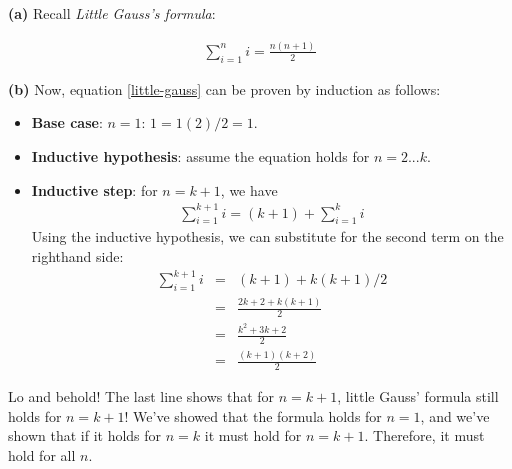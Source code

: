 \documentclass[11pt]{article}
\renewcommand{\part}[1] {\vspace{.10in} {\bf (#1)}}
\begin{document}
\part{a} Recall {\em Little Gauss's formula}:

\begin{eqnarray}
\sum_{i=1}^n i = {\frac{n(n+1)}2}  %
\label{little-gauss}        %
\end{eqnarray}

\part{b} Now, equation \ref{little-gauss} can be proven by induction as
follows:

\begin{itemize}
\item {\bf Base case}: $n=1$: $1 = 1(2)/2=1$.
\item {\bf Inductive hypothesis}: assume the equation holds for $n=2...k$.
\item {\bf Inductive step}: for $n=k+1$, we have
\begin{eqnarray*}    %
\sum_{i=1}^{k+1} i = (k+1) + \sum_{i=1}^k i
\end{eqnarray*}
Using the inductive hypothesis, we can substitute for the second term
on the righthand side:
\begin{eqnarray*}
\sum_{i=1}^{k+1} i &=& (k+1) + k(k+1)/2\\    
                   &=& {\frac{{2k+2 + k(k+1)}}2}\\
                   &=& {\frac{{k^2 + 3k + 2}}2}\\
                   &=& {\frac{(k+1)(k+2)}2}
\end{eqnarray*}
\end{itemize}

Lo and behold! The last line shows that for $n=k+1$, little Gauss'
formula still holds for $n=k+1$! We've showed that the formula holds
for $n=1$, and we've shown that if it holds for $n=k$ it must hold for
$n=k+1$. Therefore, it must hold for all $n$.
\end{document}
